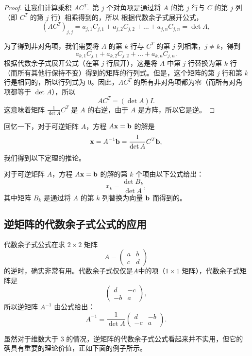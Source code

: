 \begin{proof} 让我们计算乘积 $AC^T$.~第 $j$ 个对角项是通过将 $A$ 的第 $j$ 行与 $C$ 的第 $j$ 列（即 $C^T$ 的第 $j$ 行）相乘得到的，所以 根据代数余子式展开公式，
$$(AC^T)_{j,j} = a_{j,1} C_{j,1} + a_{j,2} C_{j,2} + \dots + a_{j,n} C_{j,n} = \det A,$$

为了得到非对角项，我们需要将 $A$ 的第 $k$ 行与 $C^T$ 的第 $j$ 列相乘，$j \neq k$，得到
$$a_{k,1} C_{j,1} + a_{k,2} C_{j,2} + \dots + a_{k,n} C_{j,n}.$$
根据代数余子式展开公式（在第 $j$ 行展开），这是将 $A$ 中第 $j$ 行替换为第 $k$ 行（而所有其他行保持不变）得到的矩阵的行列式。但是，这个矩阵的第 $j$ 行和第 $k$ 行是相同的，所以行列式为 0。因此，$AC^T$ 的所有非对角项都为零（而所有对角项都等于 $\det A$），所以
$$AC^T = (\det A) I.$$
这意味着矩阵 $\frac{1}{\det A} C^T$ 是 $A$ 的右逆，由于 $A$ 是方阵，所以它是逆。\end{proof}

回忆一下，对于可逆矩阵 $A$，方程 $A \mathbf{x} = \mathbf{b}$ 的解是
$$\mathbf{x} = A^{-1} \mathbf{b} = \frac{1}{\det A} C^T \mathbf{b},$$
我们得到以下定理的推论。

\begin{corollary}\label{stmt:03-05-03}
对于可逆矩阵 $A$，方程 $A \mathbf{x} = \mathbf{b}$ 的解的第 $k$ 个项由以下公式给出：
$$
x_k = \frac{\det B_k}{\det A},
$$
其中矩阵 $B_k$ 是通过将 $A$ 的第 $k$ 列替换为向量 $\mathbf{b}$ 而得到的。
\end{corollary}

\subsection{逆矩阵的代数余子式公式的应用}\label{sec:03-05-02}

\begin{example*}
代数余子式公式在求 $2 \times 2$ 矩阵
$$A = \begin{pmatrix} a & b \\ c & d \end{pmatrix}$$
的逆时，确实非常有用。代数余子式仅仅是$A$中的项（$1 \times 1$ 矩阵），代数余子式矩阵是 $$\begin{pmatrix} d & -c \\ -b & a \end{pmatrix},$$
所以逆矩阵 $A^{-1}$ 由公式给出：
$$
A^{-1} = \frac{1}{\det A} \begin{pmatrix} d & -b \\ -c & a \end{pmatrix}.
$$
\end{example*}

虽然对于维数大于 3 的情况，逆矩阵的代数余子式公式看起来并不实用，但它的确具有重要的理论价值，正如下面的例子所示。

